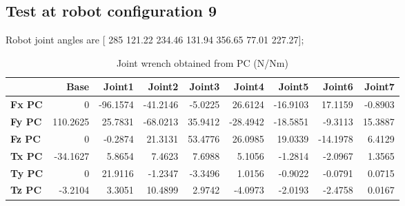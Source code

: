 
\subsection{Test at robot configuration 9}
Robot joint angles are  [ 285        121.22        234.46        131.94        356.65         77.01        227.27];

\begin{table}[h!]
	\centering
	\caption{Joint wrench obtained from PC (N/Nm)}
	\label{wrech_PC_Pose9}
	\begin{tabular}{|l|r|r|r|r|r|r|r|r|}
		\hline
		\textbf{}  & \textbf{Base} & \textbf{Joint1}  & \textbf{Joint2}  & \textbf{Joint3}  & \textbf{Joint4}  & \textbf{Joint5}  & \textbf{Joint6}  & \textbf{Joint7} \\ \hline
		\textbf{Fx PC}  & 0        & -96.1574        & -41.2146        & -5.0225        & 26.6124        & -16.9103        & 17.1159        & -0.8903 \\ \hline
		\textbf{Fy PC}  & 110.2625        & 25.7831        & -68.0213        & 35.9412        & -28.4942        & -18.5851        & -9.3113        & 15.3887 \\ \hline
		\textbf{Fz PC}  & 0        & -0.2874        & 21.3131        & 53.4776        & 26.0985        & 19.0339        & -14.1978        & 6.4129 \\ \hline
		\textbf{Tx PC}  & -34.1627        & 5.8654        & 7.4623        & 7.6988        & 5.1056        & -1.2814        & -2.0967        & 1.3565 \\ \hline
		\textbf{Ty PC}  & 0        & 21.9116        & -1.2347        & -3.3496        & 1.0156        & -0.9022        & -0.0791        & 0.0715 \\ \hline
		\textbf{Tz PC}  & -3.2104        & 3.3051        & 10.4899        & 2.9742        & -4.0973        & -2.0193        & -2.4758        & 0.0167 \\ \hline
	\end{tabular}
\end{table}

